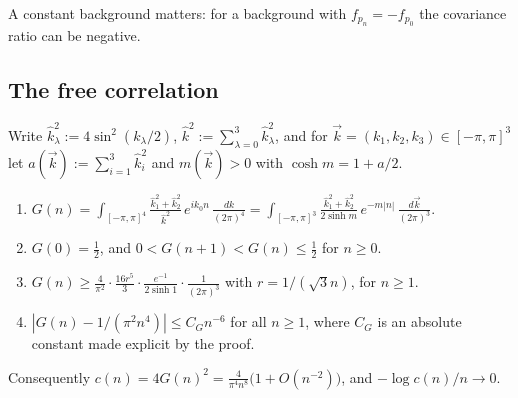 A constant background matters: for a background with $f_{p_n}=-f_{p_0}$ the covariance ratio can be negative.

\subsection{The free correlation}\label{pf:sec-G}

Write $\hat k_\lambda^2:=4\sin^2(k_\lambda/2)$, $\hat k^2:=\sum_{\lambda=0}^3\hat k_\lambda^2$, and for $\vec k=(k_1,k_2,k_3)\in[-\pi,\pi]^3$ let $a(\vec k):=\sum_{i=1}^3\hat k_i^2$ and $m(\vec k)>0$ with $\cosh m=1+a/2$.

\begin{lemma}\label{pf:lem-G}
\leavevmode
\begin{enumerate}
\item $G(n)=\displaystyle\int_{[-\pi,\pi]^4}\frac{\hat k_1^2+\hat k_2^2}{\hat k^2}\,e^{ik_0n}\,\frac{dk}{(2\pi)^4}=\int_{[-\pi,\pi]^3}\frac{\hat k_1^2+\hat k_2^2}{2\sinh m}\,e^{-m|n|}\,\frac{d\vec k}{(2\pi)^3}$.
\item $G(0)=\tfrac12$, and $0<G(n+1)<G(n)\le\tfrac12$ for $n\ge0$.
\item $G(n)\ge\frac4{\pi^2}\cdot\frac{16r^5}3\cdot\frac{e^{-1}}{2\sinh1}\cdot\frac1{(2\pi)^3}$ with $r=1/(\sqrt3n)$, for $n\ge1$.
\item $|G(n)-1/(\pi^2n^4)|\le C_Gn^{-6}$ for all $n\ge1$, where $C_G$ is an absolute constant made explicit by the proof.
\end{enumerate}
Consequently $c(n)=4G(n)^2=\frac4{\pi^4n^8}\big(1+O(n^{-2})\big)$, and $-\log c(n)/n\to0$.
\end{lemma}

